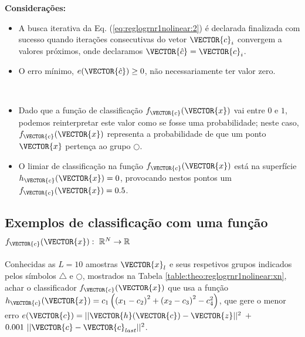 \begin{theorem}
\textbf{Considerações:}
\begin{itemize}
\item A busca iterativa da Eq. (\ref{eq:reglogrnr1nolinear:2}) 
é declarada finalizada com sucesso 
quando iterações consecutivas do vetor $\VECTOR{c}_i$ convergem a valores próximos, onde declaramos $\VECTOR{\hat{c}}=\VECTOR{c}_i$.
\item O erro mínimo, $e(\VECTOR{\hat{c}}) \geq 0$, não necessariamente ter valor zero. 
\end{itemize}
\end{theorem}
~

\begin{tcbattention}
\begin{itemize}
\item Dado que a função de classificação $f_{\VECTOR{c}}(\VECTOR{x})$ vai entre $0$ e $1$,
podemos reinterpretar este valor como se fosse uma probabilidade;
neste caso, $f_{\VECTOR{c}}(\VECTOR{x})$ representa a probabilidade de que um ponto $\VECTOR{x}$
pertença ao grupo $\bigcirc$.
\item O limiar de classificação na função $f_{\VECTOR{c}}(\VECTOR{x})$ está na superfície $h_{\VECTOR{c}}(\VECTOR{x})=0$,
provocando nestos pontos um $f_{\VECTOR{c}}(\VECTOR{x})=0.5$.
\end{itemize}
\end{tcbattention}

\subsection{Exemplos de classificação com uma função
$f_{\VECTOR{c}}(\VECTOR{x}):~\mathbb{R}^N \rightarrow \mathbb{R}$ }

\begin{example}\label{ex:theo:reglogrnr1nolinear}
Conhecidas as $L=10$ amostras $\VECTOR{x}_l$ e seus respetivos grupos indicados pelos símbolos $\bigtriangleup$ e $\bigcirc$, 
mostrados na Tabela \ref{table:theo:reglogrnr1nolinear:xn},
achar o classificador $f_{\VECTOR{c}}(\VECTOR{x})$ que usa a função 
$h_{\VECTOR{c}}(\VECTOR{x})=c_1\left( \left(x_1-c_2\right)^2 + \left(x_2-c_3\right)^2 -c_4^2\right)$, 
que gere o menor erro $e(\VECTOR{c}) =  ||\VECTOR{h}(\VECTOR{c})-\VECTOR{z}||^2$ $+$ $0.001~||\VECTOR{c}-\VECTOR{c}_{last}||^2$.
\end{example}


